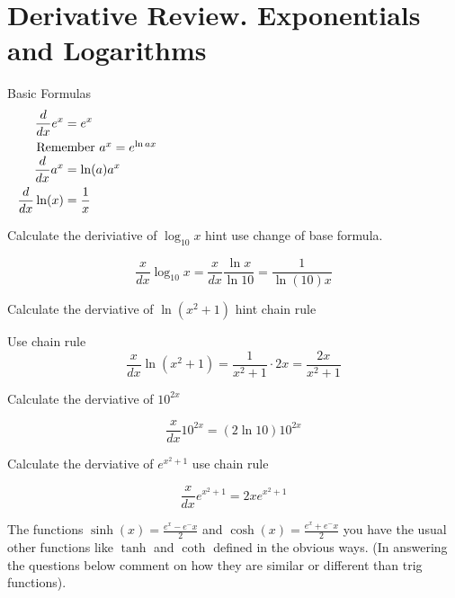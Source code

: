 \section*{Derivative Review. Exponentials and Logarithms}

Basic Formulas
\begin{equation*}
  \begin{aligned}
    \frac{d}{dx} e^x &= e^x \\
    \noalign{Remember $a^x = e^{\ln a x}$}
    \frac{d}{dx} a^x &= \ln (a) a^x \\
    \frac{d}{dx} \ln(x) &= \frac{1}{x} \\
  \end{aligned}
\end{equation*}

\begin{questions}
\question
Calculate the deriviative of $\log_{10} x$ hint use change of base formula.
\begin{solution}[1.5in]
  $$\frac{x}{dx} \log_{10}x = \frac{x}{dx} \frac{\ln x}{\ln 10}  = \frac{1}{\ln (10) x}$$
\end{solution}
\question
Calculate the derviative of $\ln (x^2+1)$ hint chain rule
\begin{solution}[1.5in]
  Use chain rule
    $$\frac{x}{dx} \ln(x^2+1) = \frac{1}{x^2+1} \cdot 2x = \frac{2x}{x^2+1}$$
\end{solution}
\question
Calculate the derviative of $10^{2x}$
\begin{solution}[1.5in]
  $$\frac{x}{dx} 10^{2x} =  (2\ln 10) 10^{2x}$$
\end{solution}
\question
Calculate the derviative of $e^{x^2+1}$ use chain rule
\begin{solution}[1.5in]
  $$\frac{x}{dx} e^{x^2+1} =  2x e^{x^2+1}$$
\end{solution}
The functions $\sinh(x) = \frac{e^x-e^-x}{2}$ and $\cosh(x) = \frac{e^x+e^-x}{2}$ you have the usual other functions like $\tanh$ and $\coth$ defined in the obvious ways. (In answering the questions below comment on how they are similar or different than trig functions).
\end{questions}
